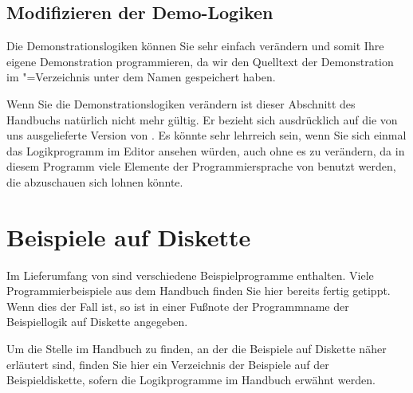 \section{Modifizieren der Demo-Logiken}\label{sec:modif-der-demo}

Die Demonstrationslogiken können Sie sehr einfach verändern und somit 
Ihre eigene Demonstration programmieren, da wir den Quelltext der 
Demonstration im \mutabor{}"=Verzeichnis unter dem Namen 
gespeichert haben. 

Wenn Sie die Demonstrationslogiken verändern ist dieser Abschnitt des
Handbuchs natürlich nicht mehr gültig. Er bezieht sich ausdrücklich
auf die von uns ausgelieferte Version von . Es
könnte sehr lehrreich sein, wenn Sie sich einmal das Logikprogramm
 im Editor ansehen würden, auch ohne es zu
verändern, da in diesem Programm viele Elemente der Programmiersprache
von \mutabor{} benutzt werden, die abzuschauen sich lohnen könnte.

\chapter{Beispiele auf Diskette}\label{cha:beisp-auf-disk}
Im Lieferumfang von \mutabor{} sind verschiedene
Beispielprogramme enthalten. Viele Programmierbeispiele aus dem
Handbuch finden Sie hier bereits fertig getippt. Wenn dies der Fall
ist, so ist in einer Fußnote der Programmname der Beispiellogik auf
Diskette angegeben.

Um die Stelle im Handbuch zu finden, an der die Beispiele auf Diskette
näher erläutert sind, finden Sie hier ein Verzeichnis der Beispiele
auf der Beispieldiskette, sofern die Logikprogramme im Handbuch
erwähnt werden.

\vspace{5mm}

